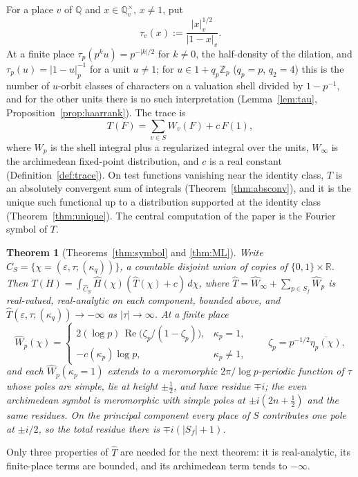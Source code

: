 \documentclass[11pt]{amsart}
\newtheorem{theorem}{Theorem}[section]
\theoremstyle{definition}
\theoremstyle{remark}
\newcommand{\R}{\mathbb R}
\newcommand{\Z}{\mathbb Z}
\newcommand{\Q}{\mathbb Q}
\newcommand{\Rel}{\operatorname{Re}}
\begin{document}
For a place $v$ of $\Q$ and $x\in\Q_v^{\times}$, $x\ne1$, put
\[
\tau_v(x):=\frac{|x|_v^{1/2}}{|1-x|_v}.
\]
At a finite place $\tau_p(p^ku)=p^{-|k|/2}$ for $k\ne0$, the half-density of
the dilation, and $\tau_p(u)=|1-u|_p^{-1}$ for a unit $u\ne1$; for
$u\in1+q_p\Z_p$ ($q_p=p$, $q_2=4$) this is the number of $u$-orbit classes of
characters on a valuation shell divided by $1-p^{-1}$, and for the other units
there is no such interpretation (Lemma~\ref{lem:tau},
Proposition~\ref{prop:haarrank}).  The trace is
\[
T(F)=\sum_{v\in S}W_v(F)+c\,F(1),
\]
where $W_p$ is the shell integral plus a regularized integral over the units,
$W_{\infty}$ is the archimedean fixed-point distribution, and $c$ is a real
constant (Definition~\ref{def:trace}).  On test functions vanishing near the
identity class, $T$ is an absolutely convergent sum of integrals
(Theorem~\ref{thm:absconv}), and it is the unique such functional up to a
distribution supported at the identity class (Theorem~\ref{thm:unique}).
The central computation of the paper is the Fourier symbol of $T$.

\begin{theorem}[Theorems~\ref{thm:symbol} and \ref{thm:ML}]\label{thm:introB}
Write $\widehat C_S=\{\chi=(\varepsilon,\tau;(\kappa_q))\}$, a countable
disjoint union of copies of $\{0,1\}\times\R$.  Then
$T(H)=\int_{\widehat C_S}\widehat H(\chi)(\widehat T(\chi)+c)\,d\chi$, where
$\widehat T=\widehat W_{\infty}+\sum_{p\in S_f}\widehat W_p$ is
real-valued, real-analytic on each component, bounded above, and
$\widehat T(\varepsilon,\tau;(\kappa_q))\to-\infty$ as $|\tau|\to\infty$.  At
a finite place
\[
\widehat W_p(\chi)=
\begin{cases}
2(\log p)\,\Rel\bigl(\zeta_p/(1-\zeta_p)\bigr), & \kappa_p=1,\\[2pt]
-c(\kappa_p)\log p, & \kappa_p\neq1,
\end{cases}
\qquad \zeta_p=p^{-1/2}\overline{\eta_p(\chi)},
\]
and each $\widehat W_p(\kappa_p=1)$ extends to a meromorphic
$2\pi/\log p$-periodic function of $\tau$ whose poles are simple, lie at
height $\pm\tfrac12$, and have residue $\mp i$; the even archimedean symbol is
meromorphic with simple poles at $\pm i(2n+\tfrac12)$ and the same residues.
On the principal component every place of $S$ contributes one pole at $\pm
i/2$, so the total residue there is $\mp i(|S_f|+1)$.
\end{theorem}

Only three properties of $\widehat T$ are needed for the next theorem: it is
real-analytic, its finite-place terms are bounded, and its archimedean term
tends to $-\infty$.
\end{document}
